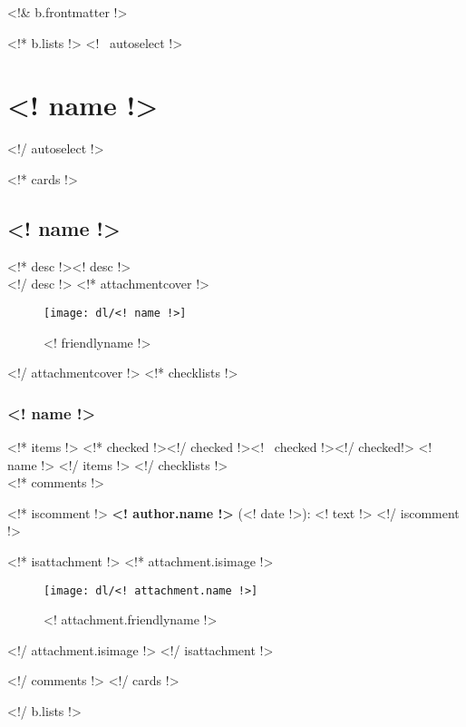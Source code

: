 



\renewcommand{\chaptertitle}{FTC 4290 - "High PHidelity"}
\renewcommand{\today}{FTC Notebook 2014-2015}
\renewcommand{\sectiontitle}{Revision <! b.lastmodified !>}

\setcounter{chapter}{1}
\setcounter{page}{1}
\renewcommand\contentsname{Table of Contents}
\setcounter{tocdepth}{2}
\renewcommand{\sectiontitle}{Table of Contents}
\tableofcontents
\renewcommand{\thesection}{}
\cleardoublepage

<!& b.frontmatter !>

\cleardoublepage
\color{black}

\cleardoublepage
\renewcommand{\chaptertitle}{Engineering Section}
\renewcommand{\today}{\mbox{}}
\renewcommand{\sectiontitle}{Directly from Trello}

<!* b.lists !>
<!~ autoselect !>\section{<! name !>}<!/ autoselect !>

<!* cards !>
\subsection{<! name !>}
<!* desc !><! desc !>\\<!/ desc !>
<!* attachmentcover !>
\begin{figure}[H]
  \centering
  \texttt{[image: dl/<! name !>]}
  \caption[]{<! friendlyname !>}
  \label{fig:<! name !>}
\end{figure}
<!/ attachmentcover !>
<!* checklists !>
\subsubsection{<! name !>}
<!* items !>
<!* checked !>\boxchecked<!/ checked !><!~ checked !>\boxunchecked<!/ checked!> <! name !>
<!/ items !>
<!/ checklists !>\mbox{}\\


<!* comments !>

<!* iscomment !>
{\bf <! author.name !>} {\color{darkgray} (<! date !>)}: <! text !>
<!/ iscomment !>

<!* isattachment !>
<!* attachment.isimage !>
\begin{figure}[H]
  \centering
  \texttt{[image: dl/<! attachment.name !>]}
  \caption[]{<! attachment.friendlyname !>}
  \label{fig:<! attachment.name !>}
\end{figure}
<!/ attachment.isimage !>
<!/ isattachment !>

<!/ comments !>
\newpage
\clearpage
<!/ cards !>

<!/ b.lists !>


